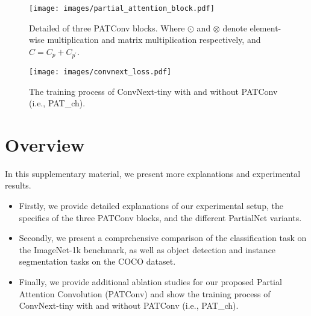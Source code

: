 \clearpage
\setcounter{page}{1}
\maketitlesupplementary

\label{sec:appandix}
\begin{figure*}[ht]
  \centering
  \texttt{[image: images/partial\_attention\_block.pdf]}
  \caption{Detailed of three PATConv blocks. Where $\odot$ and $\otimes$ denote element-wise multiplication and matrix multiplication respectively, and $C=C_p+C_{p^{'}}$.}
  \label{fig:attention_block}
\end{figure*}

\begin{figure*}[ht]
  \centering
  \texttt{[image: images/convnext\_loss.pdf]}
  \caption{The training process of ConvNext-tiny with and without PATConv (i.e., PAT\_ch).}
  \label{fig:abla_convnext}
\end{figure*}

\section{Overview}
In this supplementary material, we present more explanations and experimental results.
\begin{itemize}
  \item Firstly, we provide detailed explanations of our experimental setup, the specifics of the three PATConv blocks, and the different PartialNet variants.
  \item Secondly, we present a comprehensive comparison of the classification task on the ImageNet-1k benchmark, as well as object detection and instance segmentation tasks on the COCO dataset.
  \item Finally, we provide additional ablation studies for our proposed Partial Attention Convolution (PATConv) and show the training process of ConvNext-tiny with and without PATConv (i.e., PAT\_ch).
\end{itemize}

